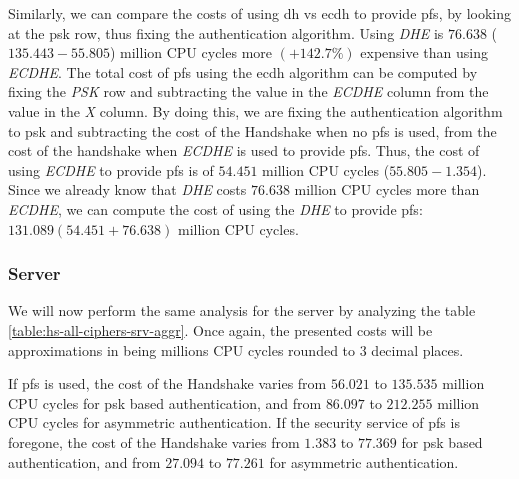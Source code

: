Similarly, we can compare the costs of using \gls{dh} vs \gls{ecdh} to provide \gls{pfs}, by
looking at the \gls{psk} row, thus fixing the authentication algorithm. Using \textit{DHE} is
$76.638$ ($135.443 - 55.805$) million CPU cycles more $(+142.7\%)$ expensive than using \textit{ECDHE}.
The total cost of \gls{pfs}
using the \gls{ecdh} algorithm can be computed by fixing the \textit{PSK} row 
and subtracting the value in the \textit{ECDHE} column from the value in the \textit{X} column. By doing this, we are
fixing the authentication algorithm to \gls{psk} and subtracting the cost of the Handshake when no \gls{pfs} is used,
from the cost of the handshake when \textit{ECDHE} is used to provide \gls{pfs}. Thus, the cost of using \textit{ECDHE}
to provide \gls{pfs} is of $54.451$ million CPU cycles ($55.805-1.354$). Since we already know that \textit{DHE} costs
$76.638$ million CPU cycles more than \textit{ECDHE}, we can compute the cost of using the \textit{DHE} to
provide \gls{pfs}: $131.089 (54.451+76.638)$ million CPU cycles.

\subsubsection{Server}

We will now perform the same analysis for the server by analyzing the table \ref{table:hs-all-ciphers-srv-aggr}. 
Once again, the presented costs will be approximations in
being millions CPU cycles rounded to $3$ decimal places.

If \gls{pfs} is used, the cost of the Handshake varies from $56.021$ to $135.535$
million CPU cycles for \gls{psk} based authentication, and from $86.097$ to $212.255$ million CPU cycles for
asymmetric authentication. If the security service of \gls{pfs} is foregone, the cost
of the Handshake varies from $1.383$  to $77.369$ for \gls{psk} based authentication,
and from $27.094$ to $77.261$ for asymmetric authentication.

